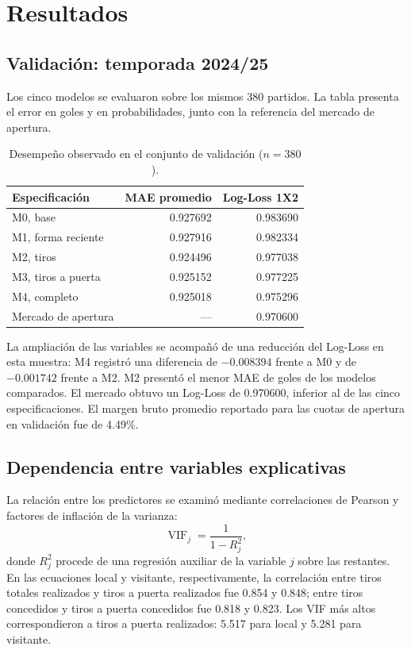 \documentclass[11pt,a4paper]{article}
\begin{document}
\section{Resultados}
\subsection{Validación: temporada 2024/25}
Los cinco modelos se evaluaron sobre los mismos 380 partidos. La tabla presenta el error en goles y en probabilidades, junto con la referencia del mercado de apertura.

\begin{table}[H]
\centering\small
\caption{Desempeño observado en el conjunto de validación ($n=380$).}
\begin{tabular}{lrr}
\toprule
Especificación & MAE promedio & Log-Loss 1X2\\
\midrule
M0, base & 0.927692 & 0.983690\\
M1, forma reciente & 0.927916 & 0.982334\\
M2, tiros & 0.924496 & 0.977038\\
M3, tiros a puerta & 0.925152 & 0.977225\\
M4, completo & 0.925018 & 0.975296\\
Mercado de apertura & --- & 0.970600\\
\bottomrule
\end{tabular}
\end{table}

La ampliación de las variables se acompañó de una reducción del Log-Loss en esta muestra: M4 registró una diferencia de $-0.008394$ frente a M0 y de $-0.001742$ frente a M2. M2 presentó el menor MAE de goles de los modelos comparados. El mercado obtuvo un Log-Loss de 0.970600, inferior al de las cinco especificaciones. El margen bruto promedio reportado para las cuotas de apertura en validación fue de 4.49\%.

\subsection{Dependencia entre variables explicativas}
La relación entre los predictores se examinó mediante correlaciones de Pearson y factores de inflación de la varianza:
\begin{equation}
\operatorname{VIF}_j=\frac{1}{1-R_j^2},
\label{eq:vif}
\end{equation}
donde $R_j^2$ procede de una regresión auxiliar de la variable $j$ sobre las restantes. En las ecuaciones local y visitante, respectivamente, la correlación entre tiros totales realizados y tiros a puerta realizados fue 0.854 y 0.848; entre tiros concedidos y tiros a puerta concedidos fue 0.818 y 0.823. Los VIF más altos correspondieron a tiros a puerta realizados: 5.517 para local y 5.281 para visitante.
\end{document}
